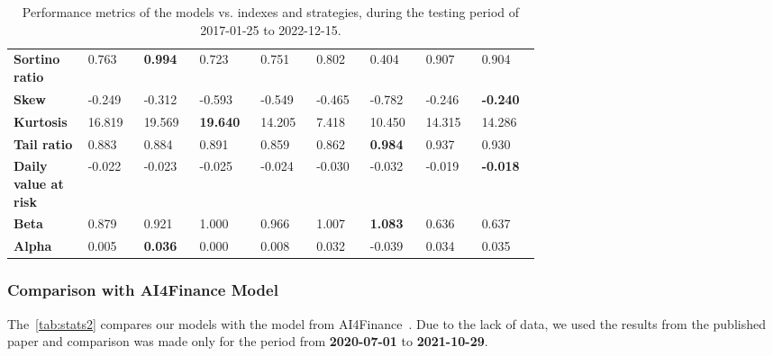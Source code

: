 \documentclass[../xlapes02]{subfiles}
\begin{document}
\begin{table}[h!]
{\begin{tabular}{*{9}{|m{0.075\linewidth}|}}
                          \bfseries Sortino ratio       & 0.763              & \color[HTML]{00F000} \bfseries 0.994 & 0.723                                 & 0.751            & 0.802 & 0.404 & 0.907 & 0.904 \\[0.5cm]
                          \bfseries Skew                & -0.249             & -0.312                               & -0.593                                & -0.549           & -0.465           & -0.782                               & -0.246                               & \color[HTML]{00F000} \bfseries -0.240 \\[0.5cm]
                          \bfseries Kurtosis            & 16.819             & 19.569                               & \color[HTML]{00F000} \bfseries 19.640 & 14.205           & 7.418 & 10.450 & 14.315 & 14.286 \\[0.5cm]
                          \bfseries Tail ratio          & 0.883              & 0.884                                & 0.891                                 & 0.859            & 0.862            & \color[HTML]{00F000} \bfseries 0.984 & 0.937 & 0.930 \\[0.5cm]
                          \bfseries Daily value at risk & -0.022             & -0.023                               & -0.025                                & -0.024           & -0.030           & -0.032                               & -0.019                               & \color[HTML]{00F000} \bfseries -0.018 \\[0.5cm]
                          \bfseries Beta                & 0.879              & 0.921                                & 1.000                                 & 0.966            & 1.007            & \color[HTML]{00F000} \bfseries 1.083 & 0.636 & 0.637 \\[0.5cm]
                          \bfseries Alpha               & 0.005              & \color[HTML]{00F000} \bfseries 0.036 & 0.000                                 & 0.008            & 0.032            & -0.039 & 0.034 & 0.035 \\[0.5cm]
                          \bottomrule
        \end{tabular}}
        \caption{Performance metrics of the models vs. indexes and strategies, during the testing period of 2017-01-25 to 2022-12-15.}
        \label{tab:stats}
    \end{table}

    \subsubsection{Comparison with AI4Finance Model}\label{subsubsec:ai4finance-model}
    The~\cref{tab:stats2} compares our models with the model from AI4Finance~\cite{finrl-portfolio-allocation-2020}. Due to the lack of data, we used the results from the published paper and comparison was made only for the period from \textbf{2020-07-01} to \textbf{2021-10-29}.
\end{document}
